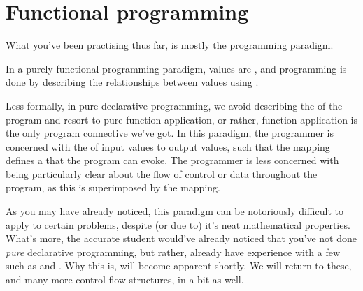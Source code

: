\section{Functional programming}

What you've been practising thus far, is mostly the 
programming paradigm.

\begin{definition}

In a purely functional programming paradigm, values are , and
programming is done by describing the relationships between values using
.

\end{definition}

Less formally, in pure declarative programming, we avoid describing the
 of the program and resort to pure function application, or rather,
function application is the only program connective we've got.  In this
paradigm, the programmer is concerned with the  of input values to
output values, such that the mapping defines a  that
the program can evoke.  The programmer is less concerned with being
particularly clear about the flow of control or data throughout the program, as
this is superimposed by the mapping.

As you may have already noticed, this paradigm can be notoriously difficult to
apply to certain problems, despite (or due to) it's neat mathematical
properties.  What's more, the accurate student would've already noticed that
you've not done \emph{pure} declarative programming, but rather, already have
experience with a few  such as  and
 .  Why this is, will become
apparent shortly. We will return to these, and many more control flow
structures, in a bit as well.

